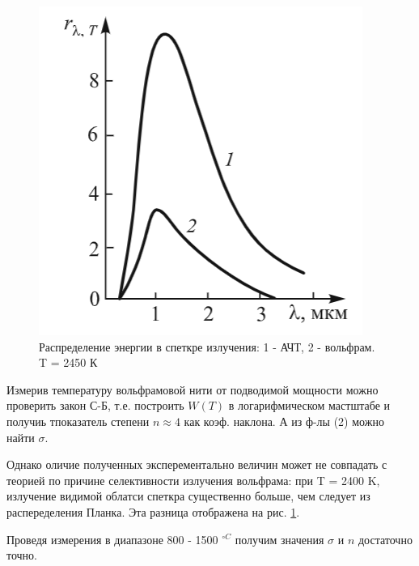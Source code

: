 \documentclass[a4paper]{article}
\begin{document}
\begin{figure}[h]
\begin{center}
\begin{minipage}[h]{0.6\linewidth}
        \caption{$\varepsilon_T(T)$} 
        \label{pe}
    \end{minipage}
	\hfill 
	\begin{minipage}[h]{0.3\linewidth}
	\includegraphics[width=1\linewidth]{p3.png}
	\caption{Распределение энергии в спеткре излучения: 1 - АЧТ, 2 - вольфрам. T = 2450 К}
	\label{p3}
	\end{minipage}
	\end{center}
\end{figure}

Измерив температуру вольфрамовой нити от подводимой мощности можно проверить закон С-Б, т.е. построить $W(T)$ в логарифмическом
мастштабе и получиь тпоказатель степени $n \approx 4$ как коэф. наклона. А из ф-лы (2) можно найти $\sigma$. \par

Однако оличие полученных эксперементально величин может не совпадать с теорией по причине селективности излучения 
вольфрама: при T = 2400 K, излучение видимой облатси спеткра существенно больше, чем следует из распеределения Планка. Эта 
разница отображена на рис. \ref{p3}. \par 

Проведя измерения в диапазоне 800 - 1500 $^{\circ C}$ получим значения $\sigma$ и $n$ достаточно точно.
\end{document}
